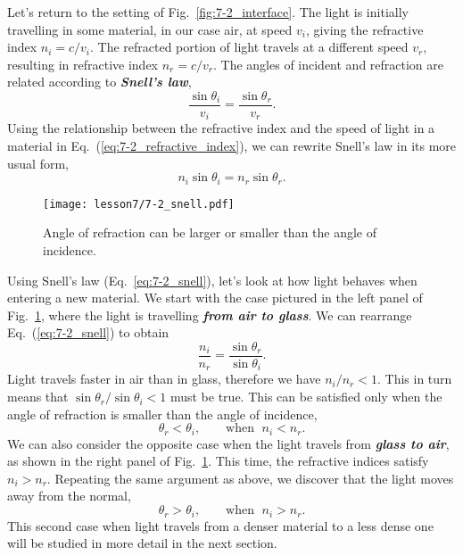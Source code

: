 Let's return to the setting of Fig.~\ref{fig:7-2_interface}.
The light is initially travelling in some material, in our case air, at speed $v_i$, giving the refractive index $n_i = c / v_i$.
The refracted portion of light travels at a different speed $v_r$, resulting in refractive index $n_r = c / v_r$.
The angles of incident and refraction are related according to \textit{\textbf{Snell's law}},
\begin{equation}
    \frac{\sin\theta_i}{v_i} = \frac{\sin\theta_r}{v_r}.
\end{equation}
Using the relationship between the refractive index and the speed of light in a material in Eq.~(\ref{eq:7-2_refractive_index}), we can rewrite Snell's law in its more usual form,
\begin{equation}
    n_i \sin \theta_i = n_r \sin \theta_r.
    \label{eq:7-2_snell}
\end{equation}

\begin{figure}
    \centering
    \texttt{[image: lesson7/7-2\_snell.pdf]}
    \caption[Snell's law.]{Angle of refraction can be larger or smaller than the angle of incidence.}
    \label{fig:7-2_snell_law}
\end{figure}

Using Snell's law (Eq.~\ref{eq:7-2_snell}), let's look at how light behaves when entering a new material.
We start with the case pictured in the left panel of Fig.~\ref{fig:7-2_snell_law}, where the light is travelling \textit{\textbf{from air to glass}}.
We can rearrange Eq.~(\ref{eq:7-2_snell}) to obtain
\begin{equation}
    \frac{n_i}{n_r} = \frac{\sin\theta_r}{\sin\theta_i}.
\end{equation}
Light travels faster in air than in glass, therefore we have $n_i / n_r < 1$.
This in turn means that $\sin\theta_r / \sin\theta_i < 1$ must be true.
This can be satisfied only when the angle of refraction is smaller than the angle of incidence,
\begin{equation}
    \theta_r < \theta_i, \qquad \text{when } \; n_i < n_r.
\end{equation}
We can also consider the opposite case when the light travels from \textit{\textbf{glass to air}}, as shown in the right panel of Fig.~\ref{fig:7-2_snell_law}.
This time, the refractive indices satisfy $n_i > n_r$.
Repeating the same argument as above, we discover that the light moves away from the normal,
\begin{equation}
    \theta_r > \theta_i, \qquad \text{when } \; n_i > n_r.
\end{equation}
This second case when light travels from a denser material to a less dense one will be studied in more detail in the next section.


